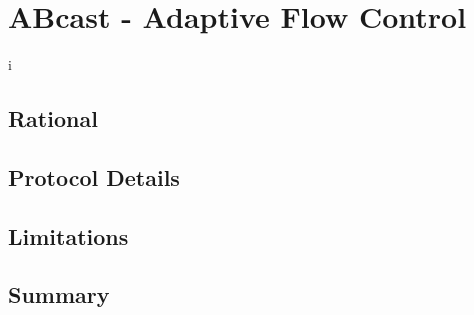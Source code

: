 \chapter{ABcast - Adaptive Flow Control}

    \graphicspath{{Chapter5-FlowControl/Figs/Vector/}{Chapter5-FlowControl/Figs/}}i

\section{Rational}

\section{Protocol Details}

\section{Limitations}

\section{Summary}